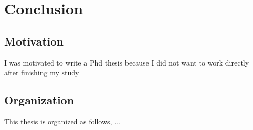 \chapter{Conclusion}
\section{Motivation}
I was motivated to write a Phd thesis because I did not want to work directly after finishing my study
\section{Organization}
This thesis is organized as follows, ...
